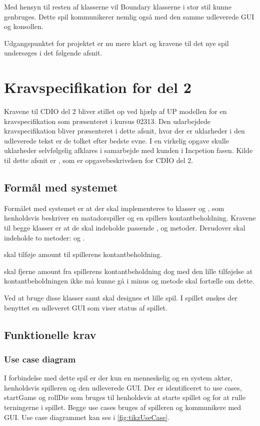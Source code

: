 Med hensyn til resten af klasserne vil Boundary klasserne i stor stil kunne genbruges. Dette spil kommunikerer nemlig også med den samme udleverede GUI og konsollen.

Udgangspunktet for projektet er nu mere klart og kravene til det nye spil undersøges i det følgende afsnit.

\section{Kravspecifikation for del 2}\label{sec:krav:kravSpec}
Kravene til CDIO del 2 bliver stillet op ved hjælp af UP modellen for en kravspecifikation som præsenteret i kursus 02313. Den udarbejdede kravspecifikation bliver præsenteret i dette afsnit, hvor der er uklarheder i den udleverede tekst er de tolket efter bedste evne. I en virkelig opgave skulle uklarheder selvfølgelig afklares i samarbejde med kunden i Incpetion fasen. Kilde til dette afsnit er \cite{CDIOdel2}, som er opgavebeskrivelsen for CDIO del 2.

\subsection{Formål med systemet}\label{sec:krav:kravSpec:formaal}
Formålet med systemet er at der skal implementeres to klasser  og , som henholdsvis beskriver en matadorspiller og en spillers kontantbeholdning. Kravene til begge klasser er at de skal indeholde passende ,  og  metoder. Derudover skal  indeholde to metoder:  og .

 skal tilføje amount til spillerens kontantbeholdning.

 skal fjerne amount fra spillerens kontantbeholdning dog med den lille tilføjelse at kontantbeholdningen ikke må kunne gå i minus og metode skal fortælle om dette.

Ved at bruge disse klasser samt  skal designes et lille spil. I spillet ønskes der benyttet en udleveret GUI som viser status af spillet.

\subsection{Funktionelle krav}\label{sec:krav:kravSpec:funkKrav}

\subsubsection{Use case diagram}
I forbindelse med dette spil er der kun en menneskelig og en system aktør, henholdsvis spilleren og den udleverede GUI. Der er identificeret to use cases, startGame og rollDie som bruges til henholdsvis at starte spillet og for at rulle terningerne i spillet. Begge use cases bruges af spilleren og kommunikere med GUI. Use case diagrammet kan ses i \vref{fig:tikzUseCase}.

